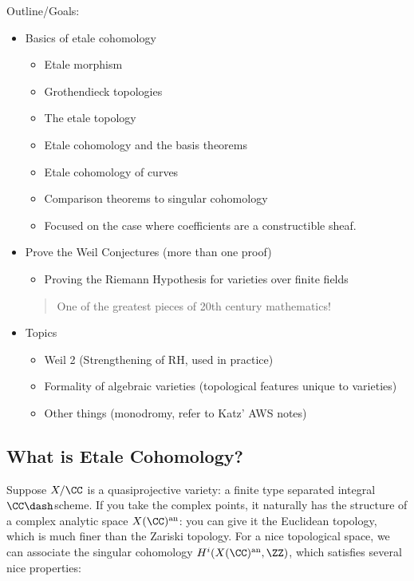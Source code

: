 Outline/Goals:

\begin{itemize}
\tightlist
\item
  Basics of etale cohomology

  \begin{itemize}
  \tightlist
  \item
    Etale morphism
  \item
    Grothendieck topologies
  \item
    The etale topology
  \item
    Etale cohomology and the basis theorems
  \item
    Etale cohomology of curves
  \item
    Comparison theorems to singular cohomology
  \item
    Focused on the case where coefficients are a constructible sheaf.
  \end{itemize}
\item
  Prove the Weil Conjectures (more than one proof)

  \begin{itemize}
  \tightlist
  \item
    Proving the Riemann Hypothesis for varieties over finite fields
  \end{itemize}

  \begin{quote}
  One of the greatest pieces of 20th century mathematics!
  \end{quote}
\item
  Topics

  \begin{itemize}
  \tightlist
  \item
    Weil 2 (Strengthening of RH, used in practice)
  \item
    Formality of algebraic varieties (topological features unique to
    varieties)
  \item
    Other things (monodromy, refer to Katz' AWS notes)
  \end{itemize}
\end{itemize}

\hypertarget{what-is-etale-cohomology}{%
\subsection{What is Etale Cohomology?}\label{what-is-etale-cohomology}}

Suppose \(X/\CC\) is a quasiprojective variety: a finite type separated
integral \(\CC\dash\)scheme. If you take the complex points, it
naturally has the structure of a complex analytic space
\(X(\CC)^{\text{an}}\): you can give it the Euclidean topology, which is
much finer than the Zariski topology. For a nice topological space, we
can associate the singular cohomology \(H^i(X(\CC)^{\text{an}}, \ZZ)\),
which satisfies several nice properties:

